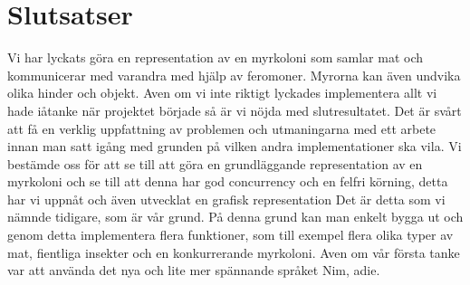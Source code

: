 \documentclass[12pt]{article}
\begin{document}
\section{Slutsatser}
Vi har lyckats göra en representation av en myrkoloni som samlar mat och kommunicerar med varandra med hjälp av feromoner.
Myrorna kan även undvika olika hinder och objekt.
Aven om vi inte riktigt lyckades implementera allt vi hade iåtanke när projektet började så är vi nöjda med slutresultatet.
Det är svårt att få en verklig uppfattning av problemen och utmaningarna med ett arbete innan man satt igång med grunden på vilken andra implementationer ska vila.
Vi bestämde oss för att se till att göra en grundläggande representation av en myrkoloni och se till att denna har god concurrency och en felfri körning,
detta har vi uppnåt och även utvecklat en grafisk representation Det är detta som vi nämnde tidigare, som är vår grund.
På denna grund kan man enkelt bygga ut och genom detta implementera flera funktioner,
som till exempel flera olika typer av mat, fientliga insekter och en konkurrerande myrkoloni.
Aven om vår första tanke var att använda det nya och lite mer spännande språket Nim,
adie.



\end{document}
